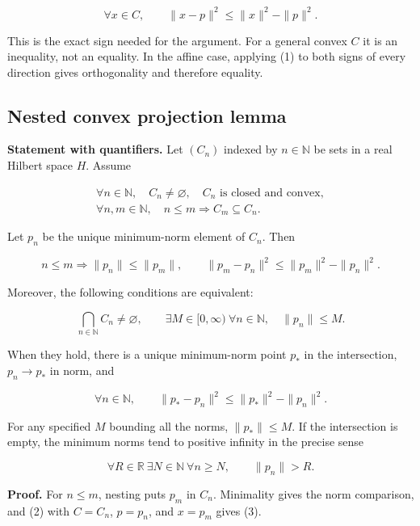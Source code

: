 \documentclass[11pt]{article}
\begin{document}
\[
\forall x\in C,\qquad
\|x-p\|^2\le\|x\|^2-\|p\|^2.           \tag{2}
\]

This is the exact sign needed for the argument. For a general convex
\(C\) it is an inequality, not an equality. In the affine case, applying
(1) to both signs of every direction gives orthogonality and therefore
equality.

\hypertarget{nested-convex-projection-lemma}{%
\subsection{Nested convex projection
lemma}\label{nested-convex-projection-lemma}}

\textbf{Statement with quantifiers.} Let \((C_n)\) indexed by
\(n \in \mathbb{N}\) be sets in a real Hilbert space \(H\). Assume

\[
\begin{gathered}
\forall n\in\mathbb N,\quad
C_n\ne\varnothing,\quad C_n\text{ is closed and convex},\\
\forall n,m\in\mathbb N,\quad n\le m\Longrightarrow C_m\subseteq C_n.
\end{gathered}
\]

Let \(p_n\) be the unique minimum-norm element of \(C_n\). Then

\[
n\le m\Longrightarrow
\|p_n\|\le\|p_m\|,
\qquad
\|p_m-p_n\|^2\le\|p_m\|^2-\|p_n\|^2. \tag{3}
\]

Moreover, the following conditions are equivalent:

\[
\bigcap_{n\in\mathbb N}C_n\ne\varnothing,
\qquad
\exists M\in[0,\infty)\ \forall n\in\mathbb N,\quad\|p_n\|\le M.
                                                               \tag{4}
\]

When they hold, there is a unique minimum-norm point \(p_*\) in the
intersection, \(p_n \to p_*\) in norm, and

\[
\forall n\in\mathbb N,\qquad
\|p_*-p_n\|^2\le\|p_*\|^2-\|p_n\|^2.  \tag{5}
\]

For any specified \(M\) bounding all the norms, \(\|p_*\|\le M\). If the
intersection is empty, the minimum norms tend to positive infinity in
the precise sense

\[
\forall R\in\mathbb R\ \exists N\in\mathbb N\ \forall n\ge N,
\qquad \|p_n\|>R.                       \tag{6}
\]

\textbf{Proof.} For \(n \le m\), nesting puts \(p_m\) in \(C_n\).
Minimality gives the norm comparison, and (2) with \(C = C_n\),
\(p = p_n\), and \(x = p_m\) gives (3).
\end{document}
